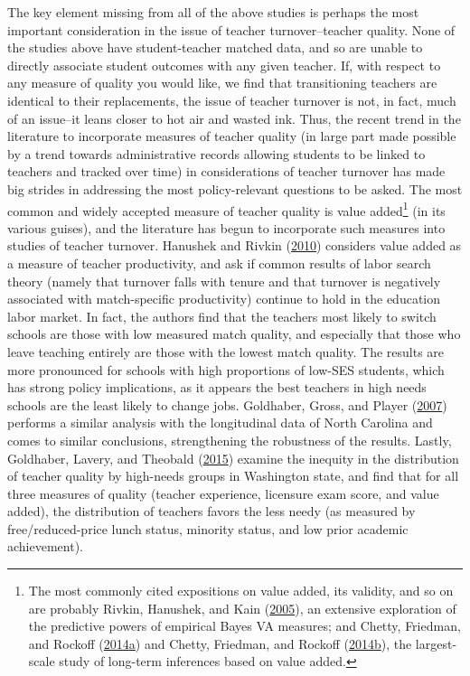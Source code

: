 \documentclass[]{article}
\let\rmarkdownfootnote\footnote%
\def\footnote{\protect\rmarkdownfootnote}
\begin{document}
The key element missing from all of the above studies is perhaps the
most important consideration in the issue of teacher turnover--teacher
quality. None of the studies above have student-teacher matched data,
and so are unable to directly associate student outcomes with any given
teacher. If, with respect to any measure of quality you would like, we
find that transitioning teachers are identical to their replacements,
the issue of teacher turnover is not, in fact, much of an issue--it
leans closer to hot air and wasted ink. Thus, the recent trend in the
literature to incorporate measures of teacher quality (in large part
made possible by a trend towards administrative records allowing
students to be linked to teachers and tracked over time) in
considerations of teacher turnover has made big strides in addressing
the most policy-relevant questions to be asked. The most common and
widely accepted measure of teacher quality is value added\footnote{The
  most commonly cited expositions on value added, its validity, and so
  on are probably Rivkin, Hanushek, and Kain
  (\protect\hyperlink{ref-rivkin}{2005}), an extensive exploration of
  the predictive powers of empirical Bayes VA measures; and Chetty,
  Friedman, and Rockoff
  (\protect\hyperlink{ref-chettyI}{2014}\protect\hyperlink{ref-chettyI}{a})
  and Chetty, Friedman, and Rockoff
  (\protect\hyperlink{ref-chettyII}{2014}\protect\hyperlink{ref-chettyII}{b}),
  the largest-scale study of long-term inferences based on value added.}
(in its various guises), and the literature has begun to incorporate
such measures into studies of teacher turnover. Hanushek and Rivkin
(\protect\hyperlink{ref-hanushek2010}{2010}) considers value added as a
measure of teacher productivity, and ask if common results of labor
search theory (namely that turnover falls with tenure and that turnover
is negatively associated with match-specific productivity) continue to
hold in the education labor market. In fact, the authors find that the
teachers most likely to switch schools are those with low measured match
quality, and especially that those who leave teaching entirely are those
with the lowest match quality. The results are more pronounced for
schools with high proportions of low-SES students, which has strong
policy implications, as it appears the best teachers in high needs
schools are the least likely to change jobs. Goldhaber, Gross, and
Player (\protect\hyperlink{ref-goldhaber2007}{2007}) performs a similar
analysis with the longitudinal data of North Carolina and comes to
similar conclusions, strengthening the robustness of the results.
Lastly, Goldhaber, Lavery, and Theobald
(\protect\hyperlink{ref-goldhaber2015}{2015}) examine the inequity in
the distribution of teacher quality by high-needs groups in Washington
state, and find that for all three measures of quality (teacher
experience, licensure exam score, and value added), the distribution of
teachers favors the less needy (as measured by free/reduced-price lunch
status, minority status, and low prior academic achievement).
\end{document}
